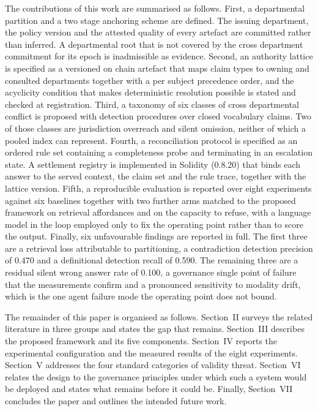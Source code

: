 \documentclass[journal]{IEEEtran}
\begin{document}
The contributions of this work are summarised as follows. First, a departmental partition and a two stage anchoring scheme are defined. The issuing department, the policy version and the attested quality of every artefact are committed rather than inferred. A departmental root that is not covered by the cross department commitment for its epoch is inadmissible as evidence. Second, an authority lattice is specified as a versioned on chain artefact that maps claim types to owning and consulted departments together with a per subject precedence order, and the acyclicity condition that makes deterministic resolution possible is stated and checked at registration. Third, a taxonomy of six classes of cross departmental conflict is proposed with detection procedures over closed vocabulary claims. Two of those classes are jurisdiction overreach and silent omission, neither of which a pooled index can represent. Fourth, a reconciliation protocol is specified as an ordered rule set containing a completeness probe and terminating in an escalation state. A settlement registry is implemented in Solidity (0.8.20) that binds each answer to the served context, the claim set and the rule trace, together with the lattice version. Fifth, a reproducible evaluation is reported over eight experiments against six baselines together with two further arms matched to the proposed framework on retrieval affordances and on the capacity to refuse, with a language model in the loop employed only to fix the operating point rather than to score the output. Finally, six unfavourable findings are reported in full. The first three are a retrieval loss attributable to partitioning, a contradiction detection precision of 0.470 and a definitional detection recall of 0.590. The remaining three are a residual silent wrong answer rate of 0.100, a governance single point of failure that the measurements confirm and a pronounced sensitivity to modality drift, which is the one agent failure mode the operating point does not bound.

The remainder of this paper is organised as follows. Section~II surveys the related literature in three groups and states the gap that remains. Section~III describes the proposed framework and its five components. Section~IV reports the experimental configuration and the measured results of the eight experiments. Section~V addresses the four standard categories of validity threat. Section~VI relates the design to the governance principles under which such a system would be deployed and states what remains before it could be. Finally, Section~VII concludes the paper and outlines the intended future work.
\end{document}
